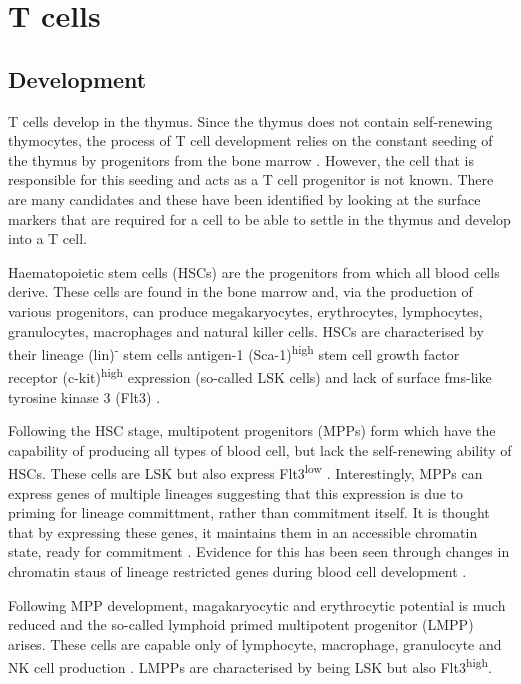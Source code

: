 \section{T cells}



\subsection{Development}
\label{subsec:Tcelldevelopment}

T cells develop in the thymus.
Since the thymus does not contain self-renewing thymocytes, the process of T cell development relies on the constant seeding of the thymus by progenitors from the bone marrow \citep{Zlotoff2011, Heinzel2007}.
However, the cell that is responsible for this seeding and acts as a T cell progenitor is not known.
There are many candidates and these have been identified by looking at the surface markers that are required for a cell to be able to settle in the thymus and develop into a T cell.

Haematopoietic stem cells (HSCs) are the progenitors from which all blood cells derive.
These cells are found in the bone marrow and, via the production of various progenitors, can produce megakaryocytes, erythrocytes, lymphocytes, granulocytes, macrophages and natural killer cells.
HSCs are characterised by their lineage (lin)\textsuperscript{-} stem cells antigen-1 (Sca-1)\textsuperscript{high} stem cell growth factor receptor (c-kit)\textsuperscript{high} expression (so-called LSK cells) and lack of surface fms-like tyrosine kinase 3 (Flt3) \citep{Welinder2011}.

Following the HSC stage, multipotent progenitors (MPPs) form which have the capability of producing all types of blood cell, but lack the self-renewing ability of HSCs.
These cells are LSK but also express Flt3\textsuperscript{low} \citep{Welinder2011}.
Interestingly, MPPs can express genes of multiple lineages \citep{Hu1997} suggesting that this expression is due to priming for lineage committment, rather than commitment itself.
It is thought that by expressing these genes, it maintains them in an accessible chromatin state, ready for commitment \citep{Welinder2011}.
Evidence for this has been seen through changes in chromatin staus of lineage restricted genes during blood cell development \citep{Weishaupt2010}.

Following MPP development, magakaryocytic and erythrocytic potential is much reduced and the so-called lymphoid primed multipotent progenitor (LMPP) arises.
These cells are capable only of lymphocyte, macrophage, granulocyte and NK cell production \citep{Adolfsson2005}.
LMPPs are characterised by being LSK but also Flt3\textsuperscript{high}.

